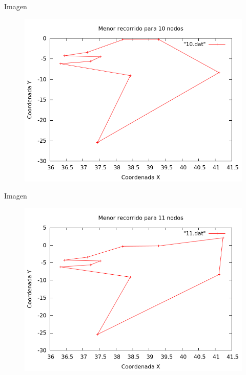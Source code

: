 \begin{frame}
	\begin{exampleblock}{Imagen}
	\begin{figure}[H]
    \centering
    \includegraphics[scale=0.35]{../TSP/Graficas/10.png}
	\end{figure}
	\end{exampleblock}
\end{frame}

\begin{frame}
	\begin{exampleblock}{Imagen}
	\begin{figure}[H]
    \centering
    \includegraphics[scale=0.35]{../TSP/Graficas/11.png}
	\end{figure}
	\end{exampleblock}
\end{frame}

